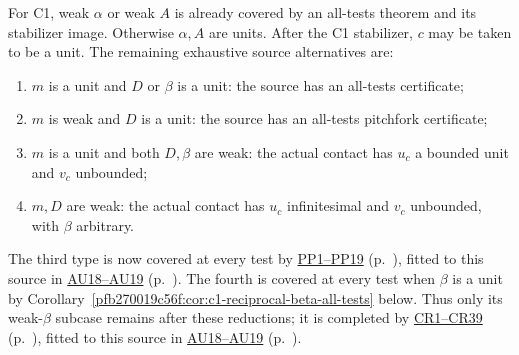 \begin{proposition}
\label{pfb270019c56f:prop:c1-positive-d-partition}
For C1, weak $\alpha$ or weak $A$ is already covered by an all-tests
theorem and its stabilizer image. Otherwise $\alpha,A$ are units.
After the C1 stabilizer, $c$ may be taken to be a unit. The remaining
exhaustive source alternatives are:
\begin{enumerate}
\item $m$ is a unit and $D$ or $\beta$ is a unit: the source has
an all-tests certificate;
\item $m$ is weak and $D$ is a unit: the source has an all-tests
pitchfork certificate;
\item $m$ is a unit and both $D,\beta$ are weak: the actual contact
has $u_c$ a bounded unit and $v_c$ unbounded;
\item $m,D$ are weak: the actual contact has $u_c$ infinitesimal
and $v_c$ unbounded, with $\beta$ arbitrary.
\end{enumerate}
The third type is now covered at every test by
\hyperref[component:p2cdf6197677b]{PP1--PP19} (p.~\pageref{component:p2cdf6197677b}), fitted to this source in \hyperref[component:pc0b2849f8d09]{AU18--AU19} (p.~\pageref{component:pc0b2849f8d09}). The fourth is covered at
every test when $\beta$ is a unit by
Corollary~\ref{pfb270019c56f:cor:c1-reciprocal-beta-all-tests} below. Thus only its
weak-$\beta$ subcase remains after these reductions; it is completed
by \hyperref[component:p98f24864b071]{CR1--CR39} (p.~\pageref{component:p98f24864b071}), fitted to this source in \hyperref[component:pc0b2849f8d09]{AU18--AU19} (p.~\pageref{component:pc0b2849f8d09}).
\end{proposition}
